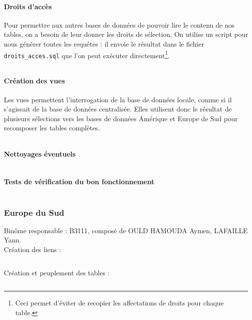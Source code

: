 \documentclass[10pt,a4paper]{article}
\theoremstyle{plain}
\begin{document}
\paragraph{Droits d'accès}

Pour permettre aux autres bases de données de pouvoir lire le contenu de nos tables, on a besoin de leur donner les droits de sélection. On utilise un script pour nous générer toutes les requêtes : il envoie le résultat dans le fichier \verb|droits_acces.sql| que l'on peut exécuter directement\footnote{Ceci permet d'éviter de recopier les affectations de droits pour chaque table.}.
\inputminted{sql}{INSA-DB12-droits-acces.sql}
\newpage

\paragraph{Création des vues}

Les vues permettent l'interrogation de la base de données locale, comme si il s'agissait de la base de données centralisée. Elles utilisent donc le résultat de plusieurs sélections vers les bases de données Amérique et Europe de Sud pour recomposer les tables complètes.

\inputminted{sql}{INSA-DB12-EuropeNord-vues.sql}

\newpage

\paragraph{Nettoyages éventuels}

\inputminted{sql}{INSA-DB12-EuropeNord-drop.sql}

\paragraph{Tests de vérification du bon fonctionnement}

\inputminted{sql}{INSA-DB12-EuropeNord-bon-fonctionnement.sql}
\newpage

\subsubsection{Europe du Sud}
Binôme responsable : B3111, composé de OULD HAMOUDA Aymen, LAFAILLE Yann.\\

Création des liens :
\inputminted{sql}{EUS_III-C-2-creation_liens.sql}
\newpage

Création et peuplement des tables :
\inputminted{sql}{EUS_III-C-3-creation_tables.sql}
\newpage
\end{document}
